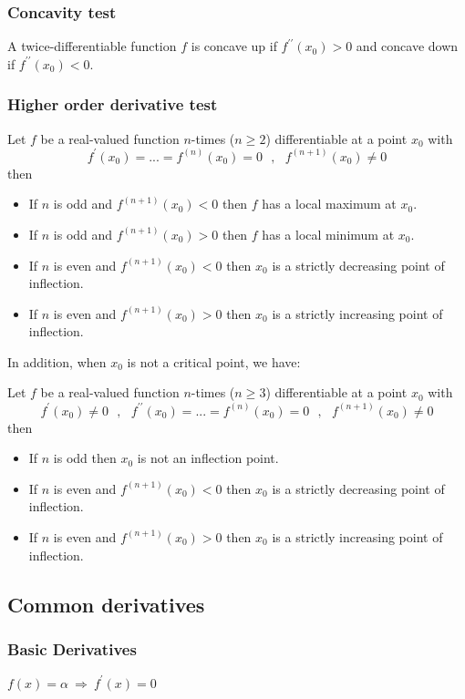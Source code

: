 \subsubsection{Concavity test}
A twice-differentiable function $f$ is concave up if $ f^{\prime \prime }(x_0)>0 $ and concave down if $ f^{\prime \prime }(x_0)<0 $.

\subsubsection{Higher order derivative test}
Let $f$ be a real-valued function $n$-times ($n\ge2$) differentiable at a point $x_0$ with
\[
f^\prime(x_0) = ... = f^{(n)}(x_0) = 0 ~~~, ~~~ f^{(n+1)}(x_0) \ne 0
\]
then
\begin{itemize}
	\item If $n$ is odd and  $ f^{(n+1)}(x_0)<0 $ then $f$ has a local maximum at $x_0$.
	\item If $n$ is odd and  $ f^{(n+1)}(x_0)>0 $ then $f$ has a local minimum at $x_0$.
	\item If $n$ is even and  $ f^{(n+1)}(x_0)<0 $ then $x_0$ is a strictly decreasing point of inflection.
	\item If $n$ is even and  $ f^{(n+1)}(x_0)>0 $ then $x_0$ is a strictly increasing point of inflection.
\end{itemize}

\medskip
In addition, when $x_0$ is not a critical point, we have:

Let $f$ be a real-valued function $n$-times ($n\ge3$) differentiable at a point $x_0$ with
\[
f^\prime(x_0)\ne0 ~~~, ~~~ f^{\prime\prime}(x_0) = ... = f^{(n)}(x_0) = 0 ~~~, ~~~ f^{(n+1)}(x_0) \ne 0
\]
then
\begin{itemize}
	\item If $n$ is odd then $x_0$ is not an inflection point.
	\item If $n$ is even and  $ f^{(n+1)}(x_0)<0 $ then $x_0$ is a strictly decreasing point of inflection.
	\item If $n$ is even and  $ f^{(n+1)}(x_0)>0 $ then $x_0$ is a strictly increasing point of inflection.
\end{itemize}



\subsection{Common derivatives}
\subsubsection{Basic Derivatives}
$ \displaystyle f(x)=\alpha ~ \Rightarrow ~ f^\prime(x)=0 $

